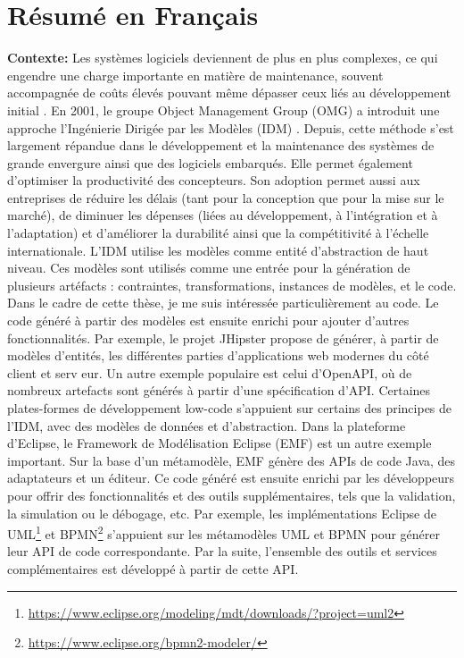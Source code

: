 \chapter*{Résumé en Français}
\textbf{Contexte:} Les systèmes logiciels deviennent de plus en plus complexes, ce qui engendre une charge importante en matière de maintenance, souvent accompagnée de coûts élevés pouvant même dépasser ceux liés au développement initial \cite{https://doi.org/10.1049/sfw2.12075}.
 En 2001, le groupe Object Management Group (OMG) a introduit une approche l’Ingénierie Dirigée par les Modèles (IDM) \cite{brambilla2017model}. Depuis, cette méthode s’est largement répandue dans le développement et la maintenance des systèmes de grande envergure ainsi que des logiciels embarqués. Elle permet également d’optimiser la productivité des concepteurs.
 Son adoption permet aussi aux entreprises de réduire les délais (tant pour la conception que pour la mise sur le marché), de diminuer les dépenses (liées au développement, à l’intégration et à l’adaptation) et d’améliorer la durabilité ainsi que la compétitivité à l’échelle internationale. L'IDM utilise les modèles comme entité d'abstraction de haut niveau. Ces modèles sont utilisés comme une entrée pour la génération de plusieurs artéfacts : contraintes, transformations, instances de modèles, et le code. Dans le cadre de cette thèse, je me suis intéressée particulièrement au code. 
Le code généré à partir des modèles est ensuite enrichi pour ajouter d'autres fonctionnalités. Par exemple, le projet JHipster propose de générer, à partir de modèles d'entités, les différentes parties d'applications web modernes du côté client et serv eur. Un autre exemple populaire est celui d'OpenAPI, où de nombreux artefacts sont générés à partir d'une spécification d'API. Certaines plates-formes de développement low-code s'appuient sur certains des principes de l'IDM, avec des modèles de données et d'abstraction. Dans la plateforme d’Eclipse, le Framework de Modélisation Eclipse (EMF) est un autre exemple important. Sur la base d'un métamodèle, EMF génère des APIs de code Java, des adaptateurs et un éditeur. Ce code généré est ensuite enrichi par les développeurs pour offrir des fonctionnalités et des outils supplémentaires, tels que la validation, la simulation ou le débogage, etc. Par exemple, les implémentations Eclipse de UML\footnote{\url{https://www.eclipse.org/modeling/mdt/downloads/?project=uml2}} et BPMN\footnote{\url{https://www.eclipse.org/bpmn2-modeler/}} s’appuient sur les métamodèles UML et BPMN pour générer leur API de code correspondante. Par la suite, l’ensemble des outils et services complémentaires est développé à partir de cette API.

